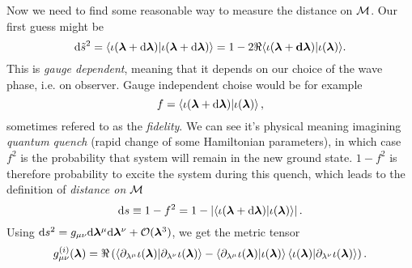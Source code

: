 Now we need to find some reasonable way to measure the distance on $\mathcal{M}$. Our first guess might be
\begin{equation}
    \mathrm{d} \tilde{s}^2 = \braket{\iota(\bm{\bm\lambda}+\mathrm{d}\bm{\bm\lambda})|\iota(\bm{\bm\lambda}+\mathrm{d}\bm{\bm\lambda})} = 1-2\Re{\braket{\iota(\bm{\bm\lambda}+\bm{\ensuremath{\mathrm{d}}}\bm\lambda)|\iota(\bm{\bm\lambda})}}.
\end{equation}
This is \emph{gauge dependent}, meaning that it depends on our choice of the wave phase, i.e. on observer. Gauge independent choise would be for example 
\begin{equation}
    f=\braket{\iota(\bm{\bm\lambda}+\mathrm{d}\bm{\bm\lambda})|\iota(\bm{\bm\lambda})},
\end{equation}
sometimes refered to as the \emph{fidelity}. We can see it's physical meaning imagining \emph{quantum quench} (rapid change of some Hamiltonian parameters), in which case $f^2$ is the probability that system will remain in the new ground state. $1-f^2$ is therefore probability to excite the system during this quench, which leads to the definition of \emph{distance on $\mathcal{M}$}
\begin{equation}
    \mathrm{d} s \equiv 1-f^2= 1-\left|\braket{\iota(\bm{\bm\lambda}+\mathrm{d}\bm{\bm\lambda})|\iota(\bm{\bm\lambda})}\right|.
\end{equation}
Using $\mathrm{d} s^2 = g_{\mu\nu}\mathrm{d} \bm\lambda^\mu \mathrm{d}\bm\lambda^\nu+\mathcal{O}(\bm\lambda^3)$, we get the metric tensor
\begin{equation}
    g_{\mu\nu}^{(i)}(\bm{\bm\lambda}) = \Re\left(\braket{\partial_{\lambda^\mu}\iota(\bm{\bm\lambda})|\partial_{\lambda^\nu}\iota(\bm{\bm\lambda})} - \braket{\partial_{\lambda^\mu}\iota(\bm{\bm\lambda})|\iota(\bm{\bm\lambda})}\braket{\iota(\bm{\bm\lambda})|\partial_{\lambda^\nu}\iota(\bm{\bm\lambda})}\right).
    \label{eq:geom.tensorDefinition}
\end{equation}

